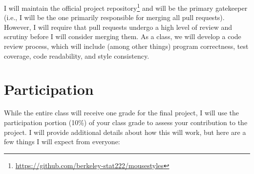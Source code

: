 \documentclass[11pt, oneside]{article}   	%
\begin{document}
I will maintain the official project
repository\footnote{\url{https://github.com/berkeley-stat222/mousestyles}}
and will be the primary gatekeeper (i.e., I will be the one primarily
responsible for merging all pull requests).  However, I will require that pull
requests undergo a high level of review and scrutiny before I will consider
merging them.  As a class, we will develop a code review process, which will
include (among other things) program correctness, test coverage, code
readability, and style consistency.

%
%
%

\section{Participation}

While the entire class will receive one grade for the final project, I will use
the participation portion (10\%) of your class grade to assess your
contribution to the project.  I will provide additional details about how this
will work, but here are a few things I will expect from everyone:
\end{document}
